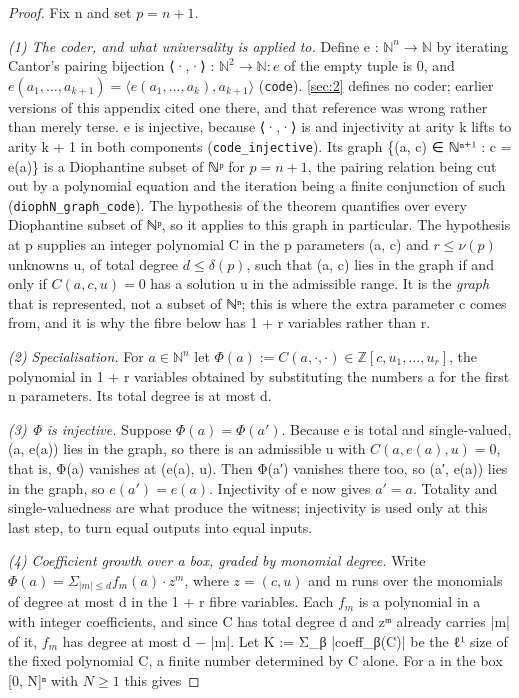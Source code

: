\begin{proof}
Fix n and set $p = n + 1$.

\emph{(1) The coder, and what universality is applied to.} Define e : $ℕ^{n} → ℕ$ by iterating Cantor's pairing bijection ⟨·,·⟩ : $ℕ^{2} → ℕ: e$ of the empty tuple is 0, and $e(a_{1}, …, a_{k+1}) = ⟨e(a_{1}, …, a_{k}), a_{k+1}⟩$ (\texttt{code}). \cref{sec:2} defines no coder; earlier versions of this appendix cited one there, and that reference was wrong rather than merely terse. e is injective, because ⟨·,·⟩ is and injectivity at arity k lifts to arity k + 1 in both components (\texttt{code\_\allowbreak{}injective}). Its graph \{(a, c) ∈ ℕⁿ⁺¹ : c = e(a)\} is a Diophantine subset of ℕᵖ for $p = n + 1$, the pairing relation being cut out by a polynomial equation and the iteration being a finite conjunction of such (\texttt{diophN\_\allowbreak{}graph\_\allowbreak{}code}). The hypothesis of the theorem quantifies over every Diophantine subset of ℕᵖ, so it applies to this graph in particular. The hypothesis at p supplies an integer polynomial C in the p parameters (a, c) and $r ≤ ν(p)$ unknowns u, of total degree $d ≤ δ(p)$, such that (a, c) lies in the graph if and only if $C(a, c, u) = 0$ has a solution u in the admissible range. It is the \emph{graph} that is represented, not a subset of ℕⁿ; this is where the extra parameter c comes from, and it is why the fibre below has 1 + r variables rather than r.

\emph{(2) Specialisation.} For $a ∈ ℕ^{n}$ let $Φ(a) := C(a, ·, ·) ∈ ℤ[c, u_{1}, …, u_{r}]$, the polynomial in 1 + r variables obtained by substituting the numbers a for the first n parameters. Its total degree is at most d.

\emph{(3) Φ is injective.} Suppose $Φ(a) = Φ(a′)$. Because e is total and single-valued, (a, e(a)) lies in the graph, so there is an admissible u with $C(a, e(a), u) = 0$, that is, Φ(a) vanishes at (e(a), u). Then Φ(a′) vanishes there too, so (a′, e(a)) lies in the graph, so $e(a′) = e(a)$. Injectivity of e now gives $a′ = a$. Totality and single-valuedness are what produce the witness; injectivity is used only at this last step, to turn equal outputs into equal inputs.

\emph{(4) Coefficient growth over a box, graded by monomial degree.} Write $Φ(a) = Σ_{|m| ≤ d} f_{m}(a) · z^{m}$, where $z = (c, u)$ and m runs over the monomials of degree at most d in the 1 + r fibre variables. Each $f_{m}$ is a polynomial in a with integer coefficients, and since C has total degree d and zᵐ already carries |m| of it, $f_{m}$ has degree at most d − |m|. Let K := Σ\_β |coeff\_β(C)| be the ℓ¹ size of the fixed polynomial C, a finite number determined by C alone. For a in the box [0, N]ⁿ with $N ≥ 1$ this gives


\end{proof}
